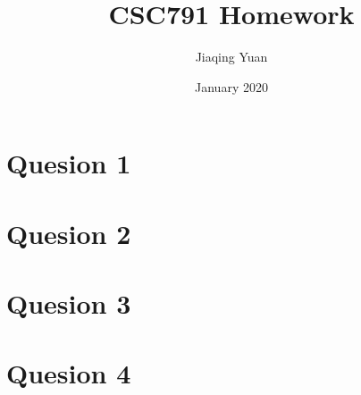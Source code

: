 \documentclass{article}
\title{CSC791 Homework}
\author{Jiaqing Yuan}
\date{January 2020}
\begin{document}
\maketitle

\section{Quesion 1}
\section{Quesion 2}
\section{Quesion 3}
\section{Quesion 4}




\end{document}
